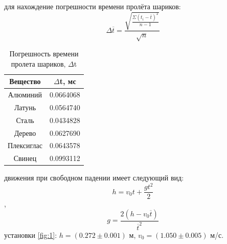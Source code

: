  для нахождение погрешности времени пролёта шариков:
\begin{equation}
    \label{eq:7}
    \Delta\overline{t}=\frac{\sqrt{\frac{\Sigma(t_i-\overline{t})^2}{{n-1}}}}{\sqrt{n}}
\end{equation}
\begin{center}
\begin{table}[H]
\centering
\caption{Погрешность времени пролета шариков, $\Delta$t}
\label{table:1}
\begin{tabular}{|c|c|}
\hline
{} Вещество & $\Delta$t, мс \\
\hline
Алюминий & 0.0664068\\
Латунь &0.0564740  \\
Сталь &0.0434828  \\
Дерево      &0.0627690    \\
Плексиглас     &0.0643578  \\
Свинец     &0.0993112   \\
\hline
\end{tabular}
\end{table}
\end{center}
 движения при свободном падении имеет следующий вид:
\begin{equation}
    \label{eq:8}
    h= v_0 t + \frac{g t^2}{2} 
\end{equation}
,
\begin{equation}
    \label{eq:9}
    g= \frac{2(h - v_0 \overline{t})}{\overline{t}^2} 
\end{equation}
 установки \ref{fig:1}: $h=(0.272\pm0.001)$ м, $v_0=(1.050\pm0.005)$ м/с.

